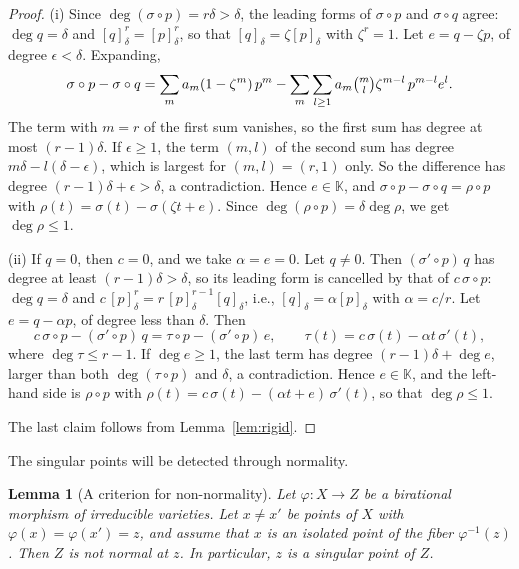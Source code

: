 \documentclass[11pt]{article}
\newtheorem{lemma}{Lemma}
\theoremstyle{definition}
\theoremstyle{remark}
\newcommand{\K}{\mathbb{K}}
\begin{document}
\begin{proof}
(i) Since $\deg(\sigma\circ p)=r\delta>\delta$, the leading forms of $\sigma\circ p$ and $\sigma\circ q$ agree: $\deg q=\delta$ and $[q]_\delta^r=[p]_\delta^r$, so that $[q]_\delta=\zeta[p]_\delta$ with $\zeta^r=1$. Let $e=q-\zeta p$, of degree $\epsilon<\delta$. Expanding,
\[
\sigma\circ p-\sigma\circ q=\sum_ma_m(1-\zeta^m)\,p^m-\sum_m\sum_{l\ge1}a_m\tbinom ml\zeta^{m-l}\,p^{m-l}e^l.
\]
The term with $m=r$ of the first sum vanishes, so the first sum has degree at most $(r-1)\delta$. If $\epsilon\ge1$, the term $(m,l)$ of the second sum has degree $m\delta-l(\delta-\epsilon)$, which is largest for $(m,l)=(r,1)$ only. So the difference has degree $(r-1)\delta+\epsilon>\delta$, a contradiction. Hence $e\in\K$, and $\sigma\circ p-\sigma\circ q=\rho\circ p$ with $\rho(t)=\sigma(t)-\sigma(\zeta t+e)$. Since $\deg(\rho\circ p)=\delta\deg\rho$, we get $\deg\rho\le1$.

(ii) If $q=0$, then $c=0$, and we take $\alpha=e=0$. Let $q\ne0$. Then $(\sigma'\circ p)\,q$ has degree at least $(r-1)\delta>\delta$, so its leading form is cancelled by that of $c\,\sigma\circ p$: $\deg q=\delta$ and $c\,[p]_\delta^r=r\,[p]_\delta^{r-1}[q]_\delta$, i.e., $[q]_\delta=\alpha[p]_\delta$ with $\alpha=c/r$. Let $e=q-\alpha p$, of degree less than $\delta$. Then
\[
c\,\sigma\circ p-(\sigma'\circ p)\,q=\tau\circ p-(\sigma'\circ p)\,e,\qquad\tau(t)=c\,\sigma(t)-\alpha t\,\sigma'(t),
\]
where $\deg\tau\le r-1$. If $\deg e\ge1$, the last term has degree $(r-1)\delta+\deg e$, larger than both $\deg(\tau\circ p)$ and $\delta$, a contradiction. Hence $e\in\K$, and the left-hand side is $\rho\circ p$ with $\rho(t)=c\,\sigma(t)-(\alpha t+e)\,\sigma'(t)$, so that $\deg\rho\le1$.

The last claim follows from Lemma~\ref{lem:rigid}.
\end{proof}

The singular points will be detected through normality.

\begin{lemma}[A criterion for non-normality]\label{lem:zmt}
Let $\varphi\colon X\to Z$ be a birational morphism of irreducible varieties. Let $x\ne x'$ be points of $X$ with $\varphi(x)=\varphi(x')=z$, and assume that $x$ is an isolated point of the fiber $\varphi^{-1}(z)$. Then $Z$ is not normal at $z$. In particular, $z$ is a singular point of $Z$.
\end{lemma}
\end{document}

